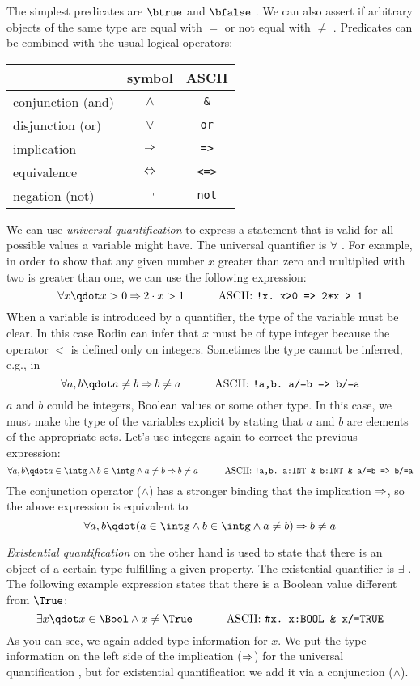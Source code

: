 The simplest predicates are $\btrue$  and $\bfalse$ .
We can also assert if arbitrary objects of the same type are equal with $=$ or not equal with $\neq$
\inascii{/=}.
Predicates can be combined with the usual logical operators:
\begin{center}
  \begin{tabular}{lcc}
                      & symbol   & ASCII \\
    \hline
    conjunction (and) & $\land$  & \texttt{\&} \\
    disjunction (or)   & $\lor$   & \texttt{or} \\
    implication       & $\mathbin\Rightarrow$  & \texttt{=>} \\
    equivalence       & $\mathbin\Leftrightarrow$  & \texttt{<=>} \\
    negation (not)    & $\lnot$  & \texttt{not} \\
  \end{tabular}
\end{center}
We can use \emph{universal quantification} to express a statement that is valid for all possible values
a variable might have. The universal quantifier is $\forall$ \inascii{!}. For example, in order to show that any given number $x$ greater than zero and multiplied with two is greater than one, we can use the following expression: 
\[ \forall x \qdot x>0 \limp 2\cdot x > 1 \lascii{!x.\ x>0\ =>\ 2*x\ >\ 1}\]
When a variable is introduced by a quantifier, the type of the variable must be clear. In this case Rodin can infer that $x$ must be of type integer because the operator $<$ is defined only on integers. Sometimes the type cannot be inferred, e.g., in
\[ \forall a,b \qdot a\neq b \limp b\neq a \lascii{!a,b.\ a/=b\ =>\ b/=a} \]
$a$ and $b$ could be integers, Boolean values or some other type.
In this case, we must make the type of the variables explicit by stating that $a$ and $b$ are elements
of the appropriate sets. Let's use integers again to correct the previous expression:
\[ \forall a,b \qdot a\in\intg \land b\in\intg \land a\neq b \limp b\neq a \lascii{!a,b.\ a:INT \& b:INT \& a/=b => b/=a} \]
The conjunction operator ($\land$) has a stronger binding that the implication $\mathbin\Rightarrow$, so the above expression is equivalent to
\[ \forall a,b \qdot (a\in\intg \land b\in\intg \land a\neq b) \limp b\neq a\]


\emph{Existential quantification} on the other hand is used to state that there is an object of a certain type fulfilling a given property. The existential quantifier is $\exists$ \inascii{\#}. The following example expression states that there is a Boolean value different from $\True$:
\[ \exists x \qdot x\in\Bool \land x\neq\True \lascii{\#x.\ x:BOOL\ \&\ x/=TRUE} \]
As you can see, we again added type information for $x$. We put the type information on the left side of the implication ($\mathbin\Rightarrow$) for the universal quantification , but for existential quantification we add it via a conjunction ($\land$).

